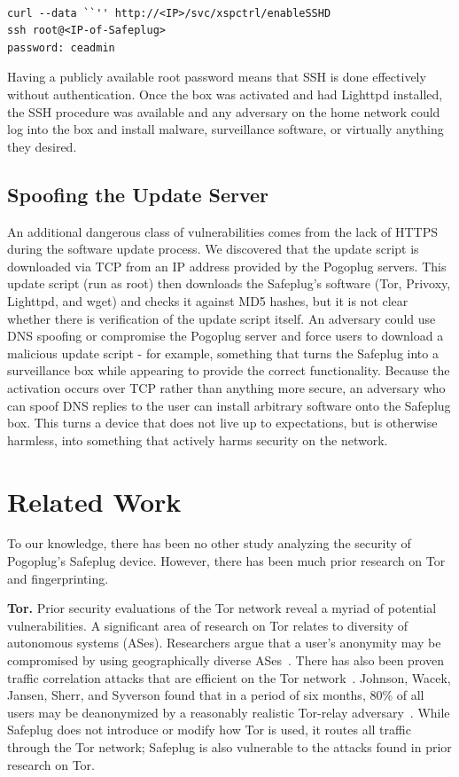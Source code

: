 \documentclass[letterpaper,twocolumn,10pt]{article}
\begin{document}
{\tt \small
\begin{verbatim}
curl --data ``'' http://<IP>/svc/xspctrl/enableSSHD
ssh root@<IP-of-Safeplug>
password: ceadmin
\end{verbatim}
}

Having a publicly available root password means that SSH is done effectively without authentication.  Once the box was activated and had Lighttpd installed, the SSH procedure was available and any adversary on the home network could log into the box and install malware, surveillance software, or virtually anything they desired.

\subsection{Spoofing the Update Server}
\label{dnsspoof}
An additional dangerous class of vulnerabilities comes from the lack of HTTPS during the software update process.  We discovered that the update script is downloaded via TCP from an IP address provided by the Pogoplug servers.  This update script (run as root) then downloads the Safeplug's software (Tor, Privoxy, Lighttpd, and wget) and checks it against MD5 hashes, but it is not clear whether there is verification of the update script itself.  An adversary could use DNS spoofing or compromise the Pogoplug server and force users to download a malicious update script - for example, something that turns the Safeplug into a surveillance box while appearing to provide the correct functionality.  Because the activation occurs over TCP rather than anything more secure, an adversary who can spoof DNS replies to the user can install arbitrary software onto the Safeplug box.  This turns a device that does not live up to expectations, but is otherwise harmless, into something that actively harms security on the network.

\section{Related Work}
To our knowledge, there has been no other study analyzing the security of Pogoplug's Safeplug device.  However, there has been much prior research on Tor~\cite{tor} and fingerprinting.

{\bf Tor.} Prior security evaluations of the Tor network reveal a myriad of potential vulnerabilities.  A significant area of research on Tor relates to diversity of autonomous systems (ASes).  Researchers argue that a user's anonymity may be compromised by using geographically diverse ASes~\cite{feamster, murdoch2}.  There has also been proven traffic correlation attacks that are efficient on the Tor network~\cite{murdoch, overlier}.  Johnson, Wacek, Jansen, Sherr, and Syverson found that in a period of six months, 80\% of all users may be deanonymized by a reasonably realistic Tor-relay adversary~\cite{tor2}.  While Safeplug does not introduce or modify how Tor is used, it routes all traffic through the Tor network; Safeplug is also vulnerable to the attacks found in prior research on Tor.  
\end{document}
